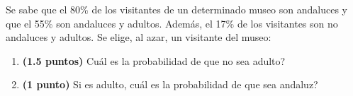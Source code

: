 
Se sabe que el 80\% de los visitantes de un determinado museo son andaluces y que el 55\% son andaluces y adultos. Además, el 17\% de los visitantes son no andaluces y adultos. Se elige, al azar, un visitante del museo:
\begin{enumerate}[label=\alph*)]
\item \textbf{(1.5 puntos)} \textquestiondown{}Cuál es la probabilidad de que no sea adulto?
\item \textbf{(1 punto)} Si es adulto, \textquestiondown{}cuál es la probabilidad de que sea andaluz?
\end{enumerate}
